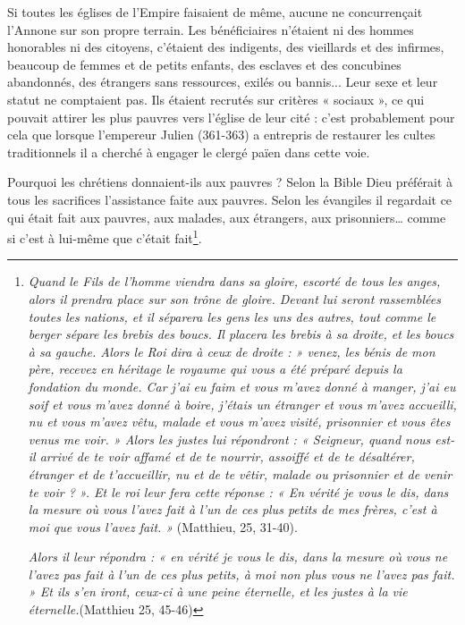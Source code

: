  Si toutes les églises de l'Empire faisaient de même, aucune ne concurrençait l'Annone sur son propre terrain. Les bénéficiaires n'étaient ni des hommes honorables ni des citoyens, c'étaient des indigents, des vieillards et des infirmes, beaucoup de femmes et de petits enfants, des esclaves et des concubines abandonnés, des étrangers sans ressources, exilés ou bannis... Leur sexe et leur statut ne comptaient pas. Ils étaient recrutés sur critères « sociaux », ce qui pouvait attirer les plus pauvres vers l'église de leur cité : c'est probablement pour cela que lorsque l'empereur Julien (361-363) a entrepris de restaurer les cultes traditionnels il a cherché à engager le clergé païen dans cette voie.

 Pourquoi les chrétiens donnaient-ils aux pauvres ? Selon la Bible Dieu préférait à tous les sacrifices l'assistance faite aux pauvres. Selon les évangiles il regardait ce qui était fait aux pauvres, aux malades, aux étrangers, aux prisonniers… comme si c'est à lui-même que c'était fait\footnote{\emph{Quand le Fils de l'homme viendra dans sa gloire, escorté de tous les anges, alors il prendra place sur son trône de gloire. Devant lui seront rassemblées toutes les nations, et il séparera les gens les uns des autres, tout comme le berger sépare les brebis des boucs. Il placera les brebis à sa droite, et les boucs à sa gauche. Alors le Roi dira à ceux de droite : » venez, les bénis de mon père, recevez en héritage le royaume qui vous a été préparé depuis la fondation du monde. Car j'ai eu faim et vous m'avez donné à manger, j'ai eu soif et vous m'avez donné à boire, j'étais un étranger et vous m'avez accueilli, nu et vous m'avez vêtu, malade et vous m'avez visité, prisonnier et vous êtes venus me voir. » Alors les justes lui répondront : « Seigneur, quand nous est-il arrivé de te voir affamé et de te nourrir, assoiffé et de te désaltérer, étranger et de t'accueillir, nu et de te vêtir, malade ou prisonnier et de venir te voir ? ». Et le roi leur fera cette réponse : « En vérité je vous le dis, dans la mesure où vous l'avez fait à l'un de ces plus petits de mes frères, c'est à moi que vous l'avez fait. »} (Matthieu, 25, 31-40).
 
  \emph{Alors il leur répondra : « en vérité je vous le dis, dans la mesure où vous ne l'avez pas fait à l'un de ces plus petits, à moi non plus vous ne l'avez pas fait. » Et ils s'en iront, ceux-ci à une peine éternelle, et les justes à la vie éternelle.}(Matthieu 25, 45-46)}.




